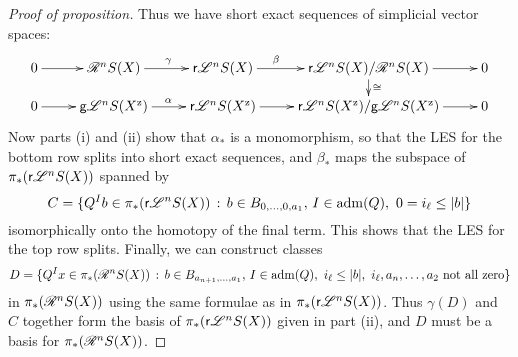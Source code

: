 \documentclass[11pt]{article}
\newcommand{\RestLie}[1]{\mathsf{r}{\scrL}^{#1}}%
\newcommand{\GoodLie}[1]{\mathsf{g}{\scrL}^{#1}}%
\newcommand{\PRLie}[1]{\scrR^{#1}}%
\newcommand{\LL}[1]{{\scrK}^{#1}}%
\newcommand{\admis}[1]{\mathrm{adm}(#1)}%
\newcommand{\Fr}[1]{#1}%
\newcommand{\LambdaOp}{Q}
\begin{document}
\begin{CategoriesOfInterest}
\begin{proof}[Proof of proposition]
Thus we have short exact sequences of simplicial vector spaces:
\[\xymatrix@R=4mm{
0
\ar[r]
&%
\Fr{\PRLie{n}}S(X)
\ar[r]^\gamma
&%
\Fr{\RestLie{n}}S(X)
\ar[r]^-(.4)\beta&%
\Fr{\RestLie{n}}S(X)/\Fr{\PRLie{n}}S(X)
\ar[r]
\ar[d]^-{\cong}
&%
0\\%
0
\ar[r]
&%
\Fr{\GoodLie{n}}S(X^\textup{z})
\ar[r]^{\alpha}
&%
\Fr{\RestLie{n}}S(X^\textup{z})
\ar[r]&%
\Fr{\RestLie{n}}S(X^\textup{z})/\Fr{\GoodLie{n}}S(X^\textup{z})
\ar[r]
&%
0
}\]
Now parts (i) and (ii) show that $\alpha_*$ is a monomorphism, so that the LES for the bottom row splits into short exact sequences, and $\beta_*$ maps the subspace of $\pi_*(\Fr{\RestLie{n}}S(X))$ spanned by
\[C=\{\LambdaOp^Ib\in\pi_*(\Fr{\RestLie{n}}S(X))\,:\,b\in B_{0,\ldots,0,a_1},\,I\in\admis{\LambdaOp},\ 0= i_\ell\leq|b|\}\]
isomorphically onto the homotopy of the final term. This shows that the LES for the top row splits. Finally, we can construct classes 
\[D=\{\LambdaOp^Ix\in\pi_*(\Fr{\PRLie{n}}S(X))\,:\,b\in B_{a_{n+1},\ldots,a_1},\,I\in\admis{\LambdaOp},\ i_\ell\leq|b|,\ i_\ell,a_{n},\ldots,a_2\textup{ not all zero}\}\]
in $\pi_*(\Fr{\PRLie{n}}S(X))$ using the same formulae as in $\pi_*(\Fr{\RestLie{n}}S(X))$. Thus $\gamma(D)$ and $C$ together form the basis of $\pi_*(\Fr{\RestLie{n}}S(X))$ given in part (ii), and $D$ must be a basis for $\pi_*(\Fr{\PRLie{n}}S(X))$.
\end{proof}








\end{CategoriesOfInterest}
\end{document}
